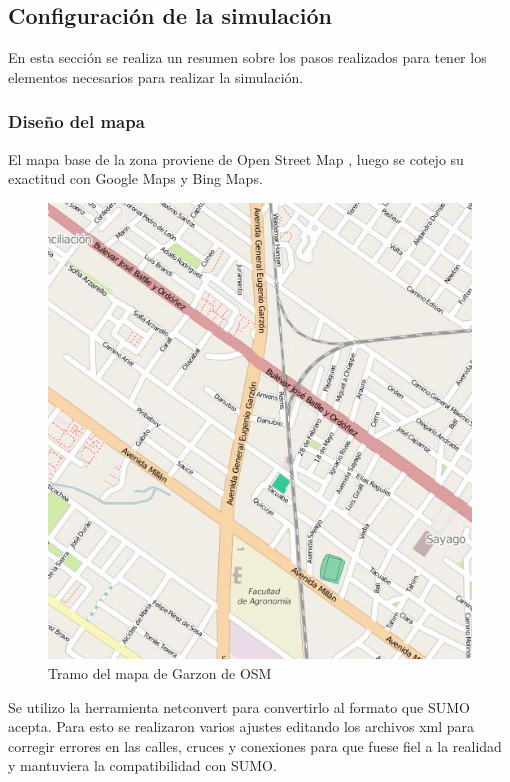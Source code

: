 \subsection{Configuración de la simulación}

En esta sección se realiza un resumen sobre los pasos realizados para tener los elementos necesarios para realizar la simulación.

\subsubsection{Diseño del mapa}


El mapa base de la zona proviene de Open Street Map \citep{OSM}, luego se cotejo su exactitud con Google Maps y Bing Maps.

\begin{figure}[h]
\centering
\includegraphics[width=0.7\linewidth]{Figures/osm_garzon}
\caption{Tramo del mapa de Garzon de OSM}
\label{fig:osm_garzon}
\end{figure}


Se utilizo la herramienta netconvert para convertirlo al formato que SUMO acepta. 
Para esto se realizaron varios ajustes editando los archivos xml para corregir errores en las calles, cruces y conexiones para que fuese fiel a la realidad y mantuviera la compatibilidad con SUMO.


